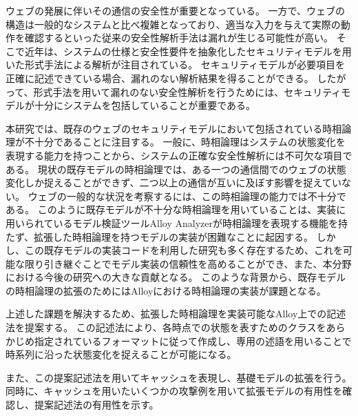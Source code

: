 \documentclass[12pt,a4paper]{jbook}
\begin{document}
ウェブの発展に伴いその通信の安全性が重要となっている。
一方で、ウェブの構造は一般的なシステムと比べ複雑となっており、適当な入力を与えて実際の動作を確認するといった従来の安全性解析手法は漏れが生じる可能性が高い。
そこで近年は、システムの仕様と安全性要件を抽象化したセキュリティモデルを用いた形式手法による解析が注目されている。
セキュリティモデルが必要項目を正確に記述できている場合、漏れのない解析結果を得ることができる。
したがって、形式手法を用いて漏れのない安全性解析を行うためには、セキュリティモデルが十分にシステムを包括していることが重要である。

本研究では、既存のウェブのセキュリティモデルにおいて包括されている時相論理が不十分であることに注目する。
一般に、時相論理はシステムの状態変化を表現する能力を持つことから、システムの正確な安全性解析には不可欠な項目である。
現状の既存モデルの時相論理では、ある一つの通信間でのウェブの状態変化しか捉えることができず、二つ以上の通信が互いに及ぼす影響を捉えていない。
ウェブの一般的な状況を考察するには、この時相論理の能力では不十分である。
このように既存モデルが不十分な時相論理を用いていることは、実装に用いられているモデル検証ツールAlloy Analyzerが時相論理を表現する機能を持たず、拡張した時相論理を持つモデルの実装が困難なことに起因する。
しかし、この既存モデルの実装コードを利用した研究も多く存在するため、これを可能な限り引き継ぐことでモデル実装の信頼性を高めることができ、また、本分野における今後の研究への大きな貢献となる。
このような背景から、既存モデルの時相論理の拡張のためにはAlloyにおける時相論理の実装が課題となる。

上述した課題を解決するため、拡張した時相論理を実装可能なAlloy上での記述法を提案する。
この記述法により、各時点での状態を表すためのクラスをあらかじめ指定されているフォーマットに従って作成し、専用の述語を用いることで時系列に沿った状態変化を捉えることが可能になる。

また、この提案記述法を用いてキャッシュを表現し、基礎モデルの拡張を行う。
同時に、キャッシュを用いたいくつかの攻撃例を用いて拡張モデルの有用性を確認し、提案記述法の有用性を示す。
\end{document}
